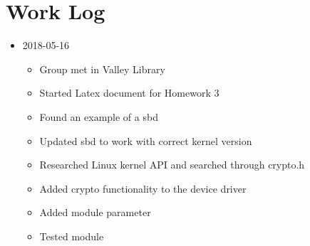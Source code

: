 \section{Work Log}
\begin{itemize}
\item 2018-05-16
	\begin{itemize}
	\item Group met in Valley Library
    \item Started Latex document for Homework 3
    \item Found an example of a sbd
    \item Updated sbd to work with correct kernel version
    \item Researched Linux kernel API and searched through crypto.h
    \item Added crypto functionality to the device driver
    \item Added module parameter
    \item Tested module
	\end{itemize}
\end{itemize}